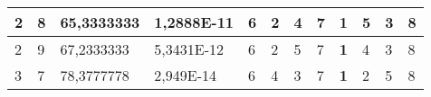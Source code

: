 \documentclass[conference]{IEEEtran}
\begin{document}
\begin{table*}[]
\begin{tabular}{|llll|llllllll|}
\multicolumn{1}{|l|}{2}                                                     & \multicolumn{1}{l|}{8}                                                        & \multicolumn{1}{l|}{65,3333333}                                                   & 1,2888E-11                     & \multicolumn{1}{l|}{6}                                                  & \multicolumn{1}{l|}{2}                                                  & \multicolumn{1}{l|}{4}                                                  & \multicolumn{1}{l|}{7}                                                  & \multicolumn{1}{l|}{\textbf{1}}                                         & \multicolumn{1}{l|}{5}                                                  & \multicolumn{1}{l|}{3}                                                  & 8                          \\ \hline
\multicolumn{1}{|l|}{2}                                                     & \multicolumn{1}{l|}{9}                                                        & \multicolumn{1}{l|}{67,2333333}                                                   & 5,3431E-12                     & \multicolumn{1}{l|}{6}                                                  & \multicolumn{1}{l|}{2}                                                  & \multicolumn{1}{l|}{5}                                                  & \multicolumn{1}{l|}{7}                                                  & \multicolumn{1}{l|}{\textbf{1}}                                         & \multicolumn{1}{l|}{4}                                                  & \multicolumn{1}{l|}{3}                                                  & 8                          \\ \hline
\multicolumn{1}{|l|}{3}                                                     & \multicolumn{1}{l|}{7}                                                        & \multicolumn{1}{l|}{78,3777778}                                                   & 2,949E-14                      & \multicolumn{1}{l|}{6}                                                  & \multicolumn{1}{l|}{4}                                                  & \multicolumn{1}{l|}{3}                                                  & \multicolumn{1}{l|}{7}                                                  & \multicolumn{1}{l|}{\textbf{1}}                                         & \multicolumn{1}{l|}{2}                                                  & \multicolumn{1}{l|}{5}                                                  & 8                          \\ \hline

\end{tabular}
\end{table*}
\end{document}
